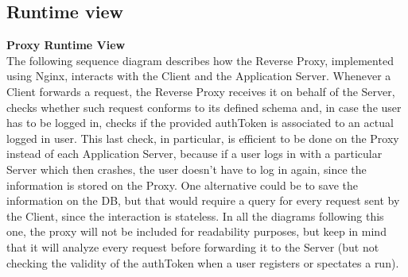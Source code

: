 \documentclass[titlepage]{article}
\begin{document}
\pagebreak

\subsection{Runtime view}

{\bf Proxy Runtime View }\\ 
The following sequence diagram describes how the Reverse Proxy, implemented using Nginx, interacts with the Client and the Application Server.
Whenever a Client forwards a request, the Reverse Proxy receives it on behalf of the Server, checks whether such request conforms to its defined schema and, in case the user has to be logged in, checks if the provided authToken is associated to an actual logged in user. This last check, in particular, is efficient to be done on the Proxy instead of each Application Server, because if a user logs in with a particular Server which then crashes, the user doesn’t have to log in again, since the information is stored on the Proxy. One alternative could be to save the information on the DB, but that would require a query for every request sent by the Client, since the interaction is stateless.
In all the diagrams following this one, the proxy will not be included for readability purposes, but keep in mind that it will analyze every request before forwarding it to the Server (but not checking the validity of the authToken when a user registers or spectates a run).
\end{document}

